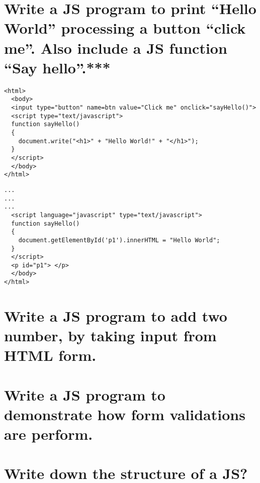 
\section{Write a JS program to print “Hello World” processing a button “click me”. Also include a JS function “Say hello”.***}
\begin{lstlisting}
<html>
  <body>
  <input type="button" name=btn value="Click me" onclick="sayHello()">
  <script type="text/javascript">
  function sayHello()
  {
    document.write("<h1>" + "Hello World!" + "</h1>");
  }
  </script>
  </body>
</html>
\end{lstlisting}
\begin{lstlisting}
...
...
...
  <script language="javascript" type="text/javascript">
  function sayHello()
  {
    document.getElementById('p1').innerHTML = "Hello World";
  }
  </script>
  <p id="p1"> </p>
  </body>
</html>
\end{lstlisting}
\section{Write a JS program to add two number, by taking input from HTML form.}
\section{Write a JS program to demonstrate how form validations are perform.}
\section{Write down the structure of a JS?}

